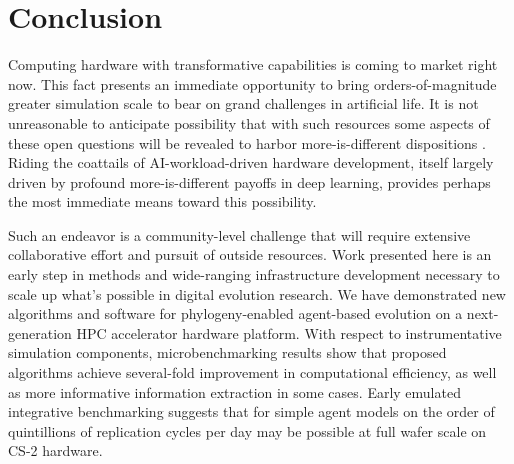 \section{Conclusion} \label{sec:conclusion}

Computing hardware with transformative capabilities is coming to market right now.
This fact presents an immediate opportunity to bring orders-of-magnitude greater simulation scale to bear on grand challenges in artificial life.
It is not unreasonable to anticipate possibility that with such resources some aspects of these open questions will be revealed to harbor more-is-different dispositions \citep{anderson1972more}.
Riding the coattails of AI-workload-driven hardware development, itself largely driven by profound more-is-different payoffs in deep learning, provides perhaps the most immediate means toward this possibility.

Such an endeavor is a community-level challenge that will require extensive collaborative effort and pursuit of outside resources.
Work presented here is an early step in methods and wide-ranging infrastructure development necessary to scale up what's possible in digital evolution research.
We have demonstrated new algorithms and software for phylogeny-enabled agent-based evolution on a next-generation HPC accelerator hardware platform.
With respect to instrumentative simulation components, microbenchmarking results show that proposed algorithms achieve several-fold improvement in computational efficiency, as well as more informative information extraction in some cases.
Early emulated integrative benchmarking suggests that for simple agent models on the order of quintillions of replication cycles per day may be possible at full wafer scale on CS-2 hardware.

